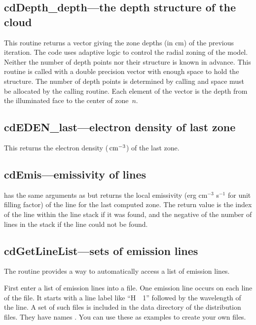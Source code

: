 \subsection{cdDepth\_depth---the depth structure of the cloud}

This routine returns a vector giving the zone depths (in cm) of the
previous iteration.
The code uses adaptive logic to control the radial
zoning of the model.
Neither the number of depth points nor their structure
is known in advance.
This routine is called with a double precision vector
with enough space to hold the structure.
The number of depth points is
determined by calling  and space must be allocated by the calling
routine.
Each element of the vector is the depth from the illuminated face
to the center of zone~$n$.

\subsection{cdEDEN\_last---electron density of last zone}

This returns the electron density (${\rm\thinspace cm^{-3}}$) of the last zone.

\subsection{cdEmis---emissivity of lines}

 has the same arguments as 
but returns the
local emissivity (erg cm$^{-3}$ s$^{-1}$ for unit filling factor) of the line for
the last computed zone.
The return value is the index of the line within
the line stack if it was found, and the negative of the number of lines
in the stack if the line could not be found.

\subsection{cdGetLineList---sets of emission lines}

The routine  provides a way
to automatically access a list of emission lines.

First enter a list of emission lines into a file.
One emission line
occurs on each line of the file.  It starts with a line label like
``H~~1'' followed by the wavelength of the line.
A set of such files is included
in the data directory of the distribution files.  They have names
.  You can use these as examples to create your own files.


